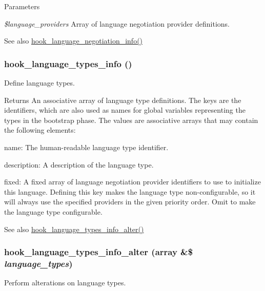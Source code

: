 \begin{DoxyParams}{Parameters}
\item[{\em \$language\_\-providers}]Array of language negotiation provider definitions.\end{DoxyParams}
\begin{DoxySeeAlso}{See also}
\hyperlink{group__language__negotiation_gabcac4b239272ba30c6320a0af2fab46e}{hook\_\-language\_\-negotiation\_\-info()} 
\end{DoxySeeAlso}
\hypertarget{group__language__negotiation_ga8932d2167557c18966cd033cfbe0f37e}{
\subsubsection[{hook\_\-language\_\-types\_\-info}]{\setlength{\rightskip}{0pt plus 5cm}hook\_\-language\_\-types\_\-info ()}}
\label{group__language__negotiation_ga8932d2167557c18966cd033cfbe0f37e}
Define language types.

\begin{DoxyReturn}{Returns}
An associative array of language type definitions. The keys are the identifiers, which are also used as names for global variables representing the types in the bootstrap phase. The values are associative arrays that may contain the following elements:
\begin{DoxyItemize}
\item name: The human-\/readable language type identifier.
\item description: A description of the language type.
\item fixed: A fixed array of language negotiation provider identifiers to use to initialize this language. Defining this key makes the language type non-\/configurable, so it will always use the specified providers in the given priority order. Omit to make the language type configurable.
\end{DoxyItemize}
\end{DoxyReturn}
\begin{DoxySeeAlso}{See also}
\hyperlink{group__language__negotiation_ga9752378ca7c389892fea3fb2960263dd}{hook\_\-language\_\-types\_\-info\_\-alter()} 
\end{DoxySeeAlso}
\hypertarget{group__language__negotiation_ga9752378ca7c389892fea3fb2960263dd}{
\subsubsection[{hook\_\-language\_\-types\_\-info\_\-alter}]{\setlength{\rightskip}{0pt plus 5cm}hook\_\-language\_\-types\_\-info\_\-alter (array \&\$ {\em language\_\-types})}}
\label{group__language__negotiation_ga9752378ca7c389892fea3fb2960263dd}
Perform alterations on language types.


